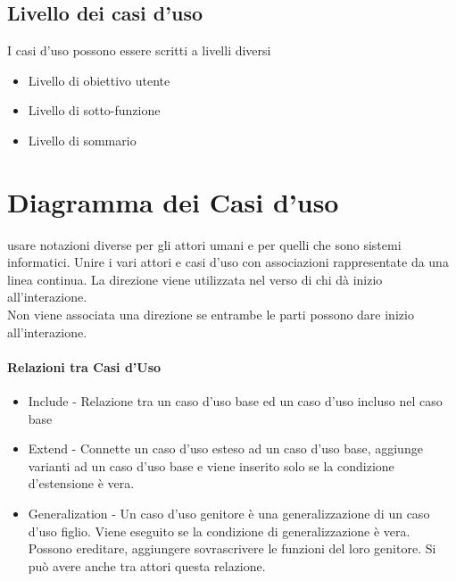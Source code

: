 \subsection{Livello dei casi d'uso}
I casi d'uso possono essere scritti a livelli diversi
\begin{itemize}
    \item Livello di obiettivo utente
    \item Livello di sotto-funzione
    \item Livello di sommario
\end{itemize}

\section{Diagramma dei Casi d'uso}
usare notazioni diverse per gli attori umani e per quelli che sono sistemi
informatici. Unire i vari attori e casi d'uso con associazioni rappresentate
da una linea continua. La direzione viene utilizzata nel verso di chi dà inizio
all'interazione.
\\ Non viene associata una direzione se entrambe le parti possono dare inizio
all'interazione.
\paragraph*{Relazioni tra Casi d'Uso}
\begin{itemize}
    \item Include - Relazione tra un caso d'uso base ed un caso d'uso incluso nel
    caso base
    \item Extend - Connette un caso d'uso esteso ad un caso d'uso base, aggiunge varianti
    ad un caso d'uso base e viene inserito solo se la condizione d'estensione è vera.
    \item Generalization - Un caso d'uso genitore è una generalizzazione di un caso d'uso
    figlio. Viene eseguito se la condizione di generalizzazione è vera. Possono ereditare, aggiungere
    sovrascrivere le funzioni del loro genitore. Si può avere anche tra attori questa
    relazione.
\end{itemize}
